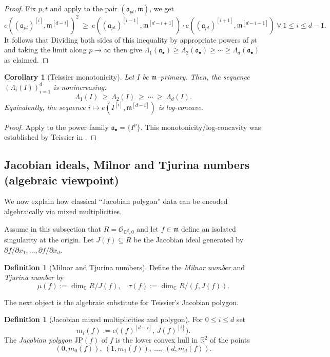 \documentclass[12pt]{amsart}
\newcommand{\RR}{\mathbb{R}}
\newcommand{\CC}{\mathbb{C}}
\newcommand{\m}{\mathfrak m}
\renewcommand{\a}{\mathfrak{a}}
\newcommand{\abul}{{\a_\bullet}}
\theoremstyle{plain}
\newtheorem{corollary}[theorem]{Corollary}
\theoremstyle{definition}
\newtheorem{definition}[theorem]{Definition}
\numberwithin{equation}{section}
\begin{document}
\begin{proof}
Fix $p,t$ and apply  to the pair $(\a_{pt},\m)$, we get
\[
e((\a_{pt})^{[i]},\m^{[d-i]})^2
\ \ge\
e((\a_{pt})^{[i-1]},\m^{[d-i+1]})\cdot e((\a_{pt})^{[i+1]},\m^{[d-i-1]}) \ \forall \ 1 \le i \le d-1.
\]
It follows that
Dividing both sides of this inequality by appropriate powers of $pt$ and taking the limit along $p\to\infty$ then give
$\Lambda_1(\abul)\ge \Lambda_2(\abul)\ge\cdots\ge \Lambda_d(\abul)$ as claimed.
\end{proof}

\begin{corollary}[Teissier monotonicity]\label{cor:Lambda-monotone-ideal}
Let $I$ be $\m$--primary. Then, the sequence $(\Lambda_i(I))_{i=1}^d$ is nonincreasing:
\[
\Lambda_1(I)\ \ge\ \Lambda_2(I)\ \ge\ \cdots\ \ge\ \Lambda_d(I).
\]
Equivalently, the sequence $i \longmapsto e(I^{[i]},\m^{[d-i]})$ is log-concave.
\end{corollary}

\begin{proof}
Apply  to the power family $\abul=\{I^p\}$.  This monotonicity/log-concavity was established by Teissier in \cite{Teissier77}.
\end{proof}

\subsection{Jacobian ideals, Milnor and Tjurina numbers (algebraic viewpoint)}

We now explain how classical ``Jacobian polygon'' data can be encoded algebraically
via mixed multiplicities.

Assume in this subsection that $R=\mathcal O_{\CC^d,0}$ and let
$f\in \m$ define an isolated singularity at the origin.
Let $J(f)\subseteq R$ be the Jacobian ideal generated by $\partial f/\partial x_1,\dots,
\partial f/\partial x_d$.

\begin{definition}[Milnor and Tjurina numbers]\label{def:milnor-tjurina}
Define the \emph{Milnor number} and \emph{Tjurina number} by
\[
\mu(f):=\dim_\CC R/J(f), \quad
\tau(f):=\dim_\CC R/(f,J(f)).
\]
\end{definition}

The next object is the algebraic substitute for Teissier's Jacobian polygon.

\begin{definition}[Jacobian mixed multiplicities and polygon]\label{def:jac-polygon}
For $0\le i\le d$ set
\[
m_i(f):=e\bigl((f)^{[d-i]},\, J(f)^{[i]}\bigr).
\]
The \emph{Jacobian polygon} $\text{JP}(f)$ of $f$ is the lower convex hull in $\RR^2$ of the points
\[
(0,m_0(f)),\ (1,m_1(f)),\ \dots,\ (d,m_d(f)).
\]
\end{definition}
\end{document}
